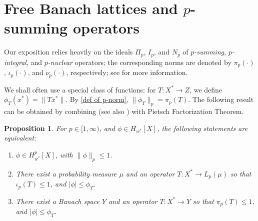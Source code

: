 \documentclass{amsart}
\theoremstyle{plain}
\newtheorem{proposition}[theorem]{Proposition}
\newtheorem{lemma}[theorem]{Lemma}
\theoremstyle{definition}
\numberwithin{equation}{section}
\newcommand{\ball}{\mathrm{B}}
\newcommand{\Hp}{H_{w^*}^{p}}
\begin{document}


\section{Free Banach lattices and $p$-summing operators}\label{general}

Our exposition relies heavily on the ideals $\Pi_p$, $I_p$, and $N_p$ of \emph{$p$-summing}, \emph{$p$-integral}, and \emph{$p$-nuclear} operators; the corresponding norms are denoted by $\pi_p( \cdot )$, $\iota_p( \cdot )$, and $\nu_p( \cdot )$, respectively; see \cite{DJT} for more information.

We shall often use a special class of functions: for $T : X^* \to Z$, we define $\phi_T(x^*) = \|T x^*\|$. By \eqref{def of p-norm}, $\|\phi_T\|_p = \pi_p(T)$. The following result can be obtained by combining \cite[Section 7]{JLTTT} (see also \cite[Proposition 2.6]{OiGEO}) with Pietsch Factorization Theorem.

\begin{proposition}\label{FBLp norm}
For $p \in [1,\infty)$, and $\phi \in H_{w^*}[X]$, the following statements are equivalent:
\begin{enumerate}
\item $\phi \in \Hp[X]$, with $\| \phi \|_p \leq 1$.
\item There exist a probability measure $\mu$ and an operator $T : X^* \to L_p(\mu)$ so that $\iota_p(T) \leq 1$, and $|\phi| \leq \phi_T$.
\item There exist a Banach space $Y$ and an operator $T : X^* \to Y$ so that $\pi_p(T) \leq 1$, and $|\phi| \leq \phi_T$.
\end{enumerate}
\end{proposition}


\end{document}

